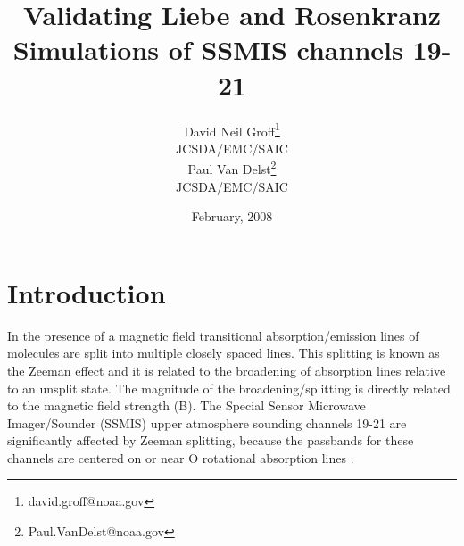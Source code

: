 

\title{Validating Liebe and Rosenkranz Simulations of SSMIS channels 19-21}
\author{David Neil Groff\footnote{david.groff@noaa.gov}\\JCSDA/EMC/SAIC\\[0.25in]
        Paul Van Delst\footnote{Paul.VanDelst@noaa.gov}\\JCSDA/EMC/SAIC\\[0.25in]}
\date{February, 2008}
\newcommand{\microtesla}{\ensuremath{\mu\textrm{T}}}
\newcommand{\degree}{\ensuremath{^\circ}}


\maketitle

\section{Introduction}
In the presence of a magnetic field transitional absorption/emission lines of molecules are
split into multiple closely spaced lines. This splitting is known as the Zeeman effect and it is related to the broadening of 
absorption lines relative to an unsplit state. The magnitude of the broadening/splitting is directly related to the magnetic field strength (B).
The Special Sensor Microwave Imager/Sounder (SSMIS) upper atmosphere sounding
channels 19-21 are significantly affected by Zeeman splitting, because the passbands for these channels are centered on or near O rotational
absorption lines \cite{ref:Han1}. 

\smallskip
\smallskip


